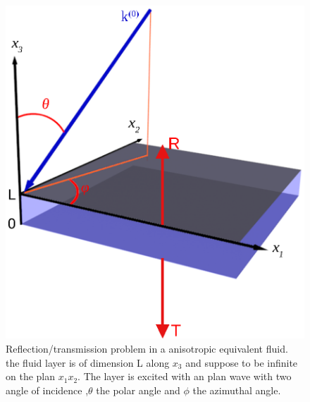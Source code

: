 \documentclass{article}
\begin{document}
    \begin{figure}[ht!]
        \centering
        \includegraphics[scale=0.6]{Fig3D.eps}
        \caption{Reflection/transmission problem in a anisotropic equivalent fluid. the fluid layer is of dimension L along $x_3$ and suppose to be infinite on the plan $x_1x_2$. The layer is excited with an plan wave with two angle of incidence ,$\theta$ the polar angle and $\phi$ the azimuthal angle.}
        \label{Schema_PB}
    \end{figure}
    
\end{document}
